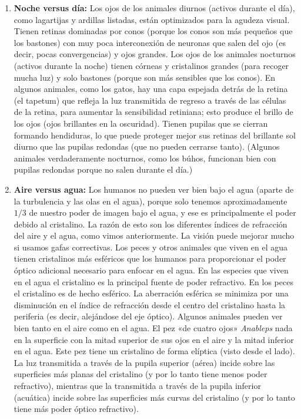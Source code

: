 \documentclass[12pt]{book}
\begin{document}
\begin{enumerate}
  \item \textbf{Noche versus día:} Los ojos de los animales diurnos (activos durante el día), como lagartijas y ardillas listadas, están optimizados para la agudeza visual. Tienen retinas dominadas por conos (porque los conos son más pequeños que los bastones) con muy poca interconexión de neuronas que salen del ojo (es decir, pocas convergencias) y ojos grandes. Los ojos de los animales nocturnos (activos durante la noche) tienen córneas y cristalinos grandes (para recoger mucha luz) y solo bastones (porque son más sensibles que los conos). En algunos animales, como los gatos, hay una capa espejada detrás de la retina (el tapetum) que refleja la luz transmitida de regreso a través de las células de la retina, para aumentar la sensibilidad retiniana; esto produce el brillo de los ojos (ojos brillantes en la oscuridad). Tienen pupilas que se cierran formando hendiduras, lo que puede proteger mejor sus retinas del brillante sol diurno que las pupilas redondas (que no pueden cerrarse tanto). (Algunos animales verdaderamente nocturnos, como los búhos, funcionan bien con pupilas redondas porque no salen durante el día.)

  \item \textbf{Aire versus agua:} Los humanos no pueden ver bien bajo el agua (aparte de la turbulencia y las olas en el agua), porque solo tenemos aproximadamente $1/3$ de nuestro poder de imagen bajo el agua, y ese es principalmente el poder debido al cristalino. La razón de esto son los diferentes índices de refracción del aire y el agua, como vimos anteriormente. La visión puede mejorar mucho si usamos gafas correctivas. Los peces y otros animales que viven en el agua tienen cristalinos más esféricos que los humanos para proporcionar el poder óptico adicional necesario para enfocar en el agua. En las especies que viven en el agua el cristalino es la principal fuente de poder refractivo. En los peces el cristalino es de hecho esférico. La aberración esférica se minimiza por una disminución en el índice de refracción desde el centro del cristalino hasta la periferia (es decir, alejándose del eje óptico). Algunos animales pueden ver bien tanto en el aire como en el agua. El pez «de cuatro ojos» \textit{Anableps} nada en la superficie con la mitad superior de sus ojos en el aire y la mitad inferior en el agua. Este pez tiene un cristalino de forma elíptica (visto desde el lado). La luz transmitida a través de la pupila superior (aérea) incide sobre las superficies más planas del cristalino (y por lo tanto tiene menos poder refractivo), mientras que la transmitida a través de la pupila inferior (acuática) incide sobre las superficies más curvas del cristalino (y por lo tanto tiene más poder óptico refractivo).


\end{enumerate}
\end{document}

